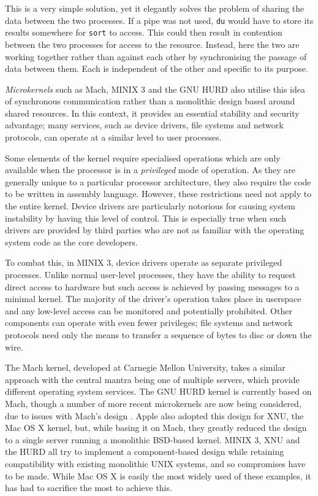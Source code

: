 This is a very simple solution, yet it elegantly solves the problem of
sharing the data between the two processes.  If a pipe was not used,
\texttt{du} would have to store its results somewhere for
\texttt{sort} to access.  This could then result in contention between
the two processes for access to the resource.  Instead, here the two
are working together rather than against each other by synchronising
the passage of data between them.  Each is independent of the other
and specific to its purpose.

\emph{Microkernels} such as Mach\cite{mach}, MINIX 3\cite{minix3} and
the GNU HURD\cite{hurd} also utilise this idea of synchronous
communication rather than a monolithic design based around shared
resources.  In this context, it provides an essential stability and
security advantage; many services, such as device drivers, file systems and
network protocols, can operate at a similar level to user processes.

Some elements of the kernel require specialised operations which are
only available when the processor is in a \emph{privileged} mode of
operation.  As they are generally unique to a particular processor
architecture, they also require the code to be written in assembly
language.  However, these restrictions need not apply to the entire
kernel.  Device drivers are particularly notorious for causing system
instability by having this level of control.  This is especially true
when such drivers are provided by third parties who are not as
familiar with the operating system code as the core developers.

To combat this, in MINIX 3, device drivers operate as separate
privileged processes.  Unlike normal user-level processes, they have
the ability to request direct access to hardware but such access is
achieved by passing messages to a minimal kernel.  The majority of the
driver's operation takes place in userspace and any low-level access
can be monitored and potentially prohibited.  Other components can
operate with even fewer privileges; file systems and network protocols
need only the means to transfer a sequence of bytes to disc or down
the wire.

The Mach kernel, developed at Carnegie Mellon University, takes a
similar approach with the central mantra being one of multiple
servers, which provide different operating system services.  The GNU
HURD kernel is currently based on Mach, though a number of more recent
microkernels are now being considered, due to issues with Mach's
design \cite{hurd:critique}.  Apple also adopted this design for XNU,
the Mac OS X kernel, but, while basing it on Mach, they greatly
reduced the design to a single server running a monolithic BSD-based
kernel.  MINIX 3, XNU and the HURD all try to implement a
component-based design while retaining compatibility with existing
monolithic UNIX systems, and so compromises have to be made.  While
Mac OS X is easily the most widely used of these examples, it has had
to sacrifice the most to achieve this.

